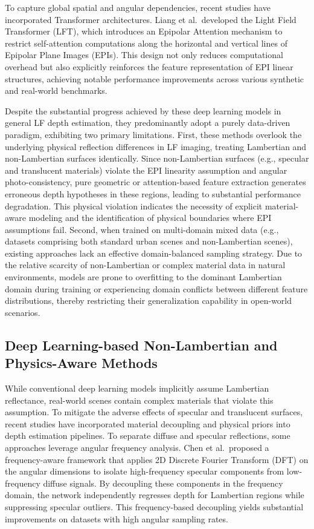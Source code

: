 \documentclass[lettersize,journal]{IEEEtran}
\begin{document}
To capture global spatial and angular dependencies, recent studies have incorporated Transformer architectures. Liang et al.\ developed the Light Field Transformer (LFT), which introduces an Epipolar Attention mechanism to restrict self-attention computations along the horizontal and vertical lines of Epipolar Plane Images (EPIs). This design not only reduces computational overhead but also explicitly reinforces the feature representation of EPI linear structures, achieving notable performance improvements across various synthetic and real-world benchmarks.

Despite the substantial progress achieved by these deep learning models in general LF depth estimation, they predominantly adopt a purely data-driven paradigm, exhibiting two primary limitations. First, these methods overlook the underlying physical reflection differences in LF imaging, treating Lambertian and non-Lambertian surfaces identically. Since non-Lambertian surfaces (e.g., specular and translucent materials) violate the EPI linearity assumption and angular photo-consistency, pure geometric or attention-based feature extraction generates erroneous depth hypotheses in these regions, leading to substantial performance degradation. This physical violation indicates the necessity of explicit material-aware modeling and the identification of physical boundaries where EPI assumptions fail. Second, when trained on multi-domain mixed data (e.g., datasets comprising both standard urban scenes and non-Lambertian scenes), existing approaches lack an effective domain-balanced sampling strategy. Due to the relative scarcity of non-Lambertian or complex material data in natural environments, models are prone to overfitting to the dominant Lambertian domain during training or experiencing domain conflicts between different feature distributions, thereby restricting their generalization capability in open-world scenarios.

\subsection{Deep Learning-based Non-Lambertian and Physics-Aware Methods}

While conventional deep learning models implicitly assume Lambertian reflectance, real-world scenes contain complex materials that violate this assumption. To mitigate the adverse effects of specular and translucent surfaces, recent studies have incorporated material decoupling and physical priors into depth estimation pipelines. To separate diffuse and specular reflections, some approaches leverage angular frequency analysis. Chen et al.\ proposed a frequency-aware framework that applies 2D Discrete Fourier Transform (DFT) on the angular dimensions to isolate high-frequency specular components from low-frequency diffuse signals. By decoupling these components in the frequency domain, the network independently regresses depth for Lambertian regions while suppressing specular outliers. This frequency-based decoupling yields substantial improvements on datasets with high angular sampling rates.
\end{document}
